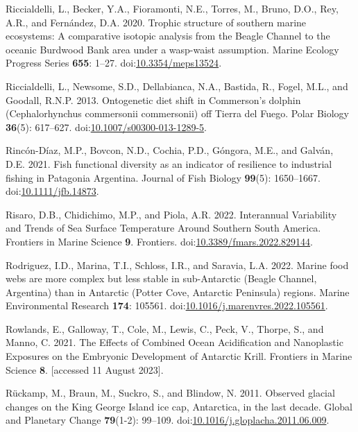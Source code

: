 \documentclass[
]{article}
\newlength{\cslhangindent}
\newenvironment{CSLReferences}[2] %
 {\begin{list}{}{%
  \setlength{\itemindent}{0pt}
  \setlength{\leftmargin}{0pt}
  \setlength{\parsep}{0pt}
  \ifodd #1
   \setlength{\leftmargin}{\cslhangindent}
   \setlength{\itemindent}{-1\cslhangindent}
  \fi
  \setlength{\itemsep}{#2\baselineskip}}}
 {\end{list}}
\begin{document}
\begin{CSLReferences}{1}{0}
Riccialdelli, L., Becker, Y.A., Fioramonti, N.E., Torres, M., Bruno,
D.O., Rey, A.R., and Fernández, D.A. 2020. Trophic structure of southern
marine ecosystems: A comparative isotopic analysis from the {Beagle
Channel} to the oceanic {Burdwood Bank} area under a wasp-waist
assumption. Marine Ecology Progress Series \textbf{655}: 1--27.
doi:\href{https://doi.org/10.3354/meps13524}{10.3354/meps13524}.

Riccialdelli, L., Newsome, S.D., Dellabianca, N.A., Bastida, R., Fogel,
M.L., and Goodall, R.N.P. 2013. Ontogenetic diet shift in {Commerson}'s
dolphin ({Cephalorhynchus} commersonii commersonii) off {Tierra} del
{Fuego}. Polar Biology \textbf{36}(5): 617--627.
doi:\href{https://doi.org/10.1007/s00300-013-1289-5}{10.1007/s00300-013-1289-5}.

Rincón-Díaz, M.P., Bovcon, N.D., Cochia, P.D., Góngora, M.E., and
Galván, D.E. 2021. Fish functional diversity as an indicator of
resilience to industrial fishing in {Patagonia Argentina}. Journal of
Fish Biology \textbf{99}(5): 1650--1667.
doi:\href{https://doi.org/10.1111/jfb.14873}{10.1111/jfb.14873}.

Risaro, D.B., Chidichimo, M.P., and Piola, A.R. 2022. Interannual
{Variability} and {Trends} of {Sea Surface Temperature Around Southern
South America}. Frontiers in Marine Science \textbf{9}. Frontiers.
doi:\href{https://doi.org/10.3389/fmars.2022.829144}{10.3389/fmars.2022.829144}.

Rodriguez, I.D., Marina, T.I., Schloss, I.R., and Saravia, L.A. 2022.
Marine food webs are more complex but less stable in sub-{Antarctic}
({Beagle Channel}, {Argentina}) than in {Antarctic} ({Potter Cove},
{Antarctic Peninsula}) regions. Marine Environmental Research
\textbf{174}: 105561.
doi:\href{https://doi.org/10.1016/j.marenvres.2022.105561}{10.1016/j.marenvres.2022.105561}.

Rowlands, E., Galloway, T., Cole, M., Lewis, C., Peck, V., Thorpe, S.,
and Manno, C. 2021. The {Effects} of {Combined Ocean Acidification} and
{Nanoplastic Exposures} on the {Embryonic Development} of {Antarctic
Krill}. Frontiers in Marine Science \textbf{8}. {[}accessed 11 August
2023{]}.

Rückamp, M., Braun, M., Suckro, S., and Blindow, N. 2011. Observed
glacial changes on the {King George Island} ice cap, {Antarctica}, in
the last decade. Global and Planetary Change \textbf{79}(1-2): 99--109.
doi:\href{https://doi.org/10.1016/j.gloplacha.2011.06.009}{10.1016/j.gloplacha.2011.06.009}.


\end{CSLReferences}
\end{document}

